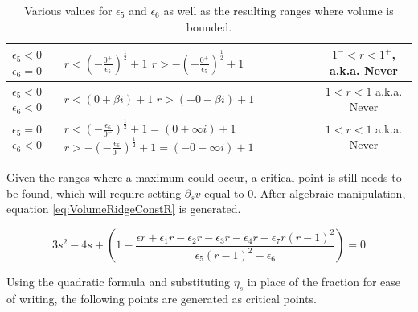 \begin{table}[h]
\begin{tabular}{|p{1cm}|p{6cm}|c|}
        $\epsilon_5<0$
        \newline
        $\epsilon_6=0$
        &
        $r< \left(-\frac{0^+}{\epsilon_5}\right)^\frac{1}{2}+1$
        \newline
        $r> -\left(-\frac{0^+}{\epsilon_5}\right)^\frac{1}{2}+1$
        &
        $1^- < r< 1^+$, a.k.a. Never
        \\
        \hline
        
        $\epsilon_5<0$
        \newline
        $\epsilon_6<0$
        &
        $r< (0+\beta i)+1$
        \newline
        $r> (-0-\beta i)+1$
        &
        $1<r<1$ a.k.a. Never
        \\
        \hline
        
        $\epsilon_5=0$
        \newline
        $\epsilon_6<0$
        &
        $r< \left(-\frac{\epsilon_6}{0^-}\right)^\frac{1}{2}+1=(0+\infty i)+1$
        \newline
        $r> -\left(-\frac{\epsilon_6}{0^-}\right)^\frac{1}{2}+1=(-0-\infty i)+1$
        &
        $1<r<1$ a.k.a. Never
        \\
        \hline
    \end{tabular}
    \caption{Various values for $\epsilon_5$ and $\epsilon_6$ as well as the resulting ranges where volume is bounded.}
    \label{tab:BoundedVolumeRanges}
\end{table}

Given the ranges where a maximum could occur, a critical point is still needs to be found, which will require setting $\partial_sv$ equal to $0$. After algebraic manipulation, equation \ref{eq:VolumeRidgeConstR} is generated.

\begin{equation}
    \label{eq:VolumeRidgeConstR}
    3s^2-4s+\left( 1-\frac{
    		\epsilon r+
		\epsilon_1 r-
		\epsilon_2 r-
		\epsilon_3 r-
		\epsilon_4 r-
		\epsilon_7 r(r-1)^2		
	}{
		\epsilon_5(r-1)^2-\epsilon_6
	}
    \right)=0
\end{equation}

 Using the quadratic formula and substituting $\eta_s$ in place of the fraction for ease of writing, the following points are generated as critical points.
 
